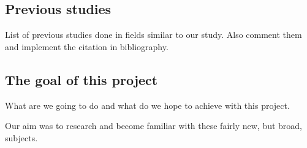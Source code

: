 \subsection{Previous studies}
\label{subsec:PrevStud}
List of previous studies done in fields similar to our study. Also comment them and implement the citation in bibliography.




\subsection{The goal of this project}
\label{subsec:Goal}
What are we going to do and what do we hope to achieve with this project.

Our aim was to research and become familiar with these fairly new, but broad, subjects. 
\newpage
